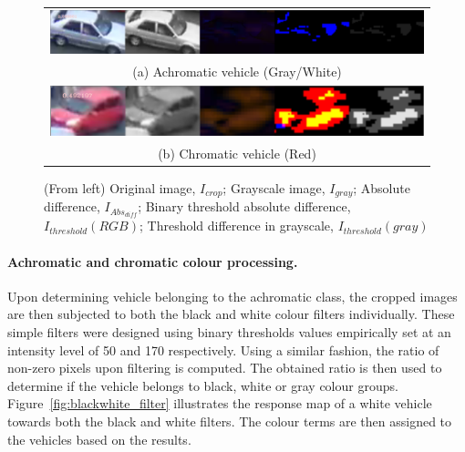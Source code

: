 \begin{figure}[htb!]
  \centering
\begin{tabular}{c}
 \includegraphics[width=0.9\linewidth]{image/general/achromatic_threshold5.PNG} \\
 (a) Achromatic vehicle (Gray/White) \\
 \includegraphics[width=0.9\linewidth]{image/general/achromatic_threshold_color2.PNG}\\
(b) Chromatic vehicle (Red)
\end{tabular}
\caption{(From left) Original image, $I_{crop}$; Grayscale image, $I_{gray}$; Absolute difference, $I_{Abs_{diff}}$; Binary threshold absolute difference, $I_{threshold}(RGB)$; Threshold difference in grayscale, $I_{threshold}(gray)$} \label{fig:achromatic_thresh}
\end{figure}

\paragraph{Achromatic and chromatic colour processing.} Upon determining vehicle belonging to the achromatic class, the cropped images are then subjected to both the black and white colour filters individually. These simple filters were designed using binary thresholds values empirically set at an intensity level of 50 and 170 respectively.
Using a similar fashion, the ratio of non-zero pixels upon filtering is computed. The obtained ratio is then used to determine if the vehicle belongs to black, white or gray colour groups. Figure~\ref{fig:blackwhite_filter} illustrates the response map of a white vehicle towards both the black and white filters.
The colour terms are then assigned to the vehicles based on the results.

